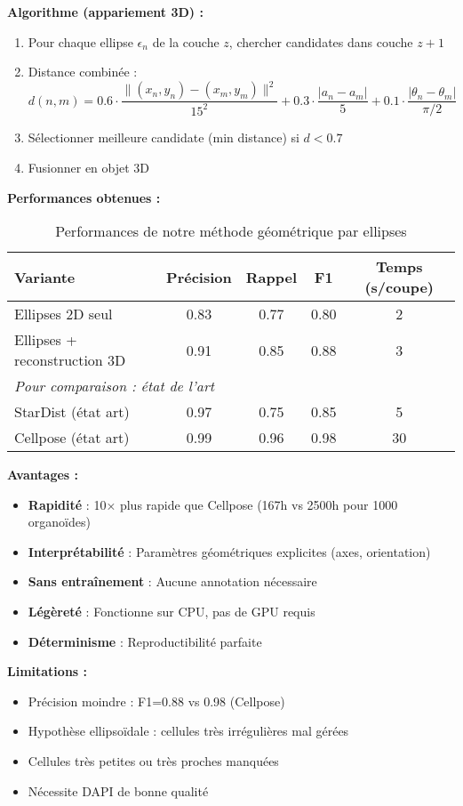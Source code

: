 \textbf{Algorithme (appariement 3D) :}
\begin{enumerate}
    \item Pour chaque ellipse $\epsilon_n$ de la couche $z$, chercher candidates dans couche $z+1$
    \item Distance combinée :
        \[
        d(n, m) = 0.6 \cdot \frac{\|(x_n, y_n) - (x_m, y_m)\|^2}{15^2} + 0.3 \cdot \frac{|a_n - a_m|}{5} + 0.1 \cdot \frac{|\theta_n - \theta_m|}{\pi/2}
        \]
    \item Sélectionner meilleure candidate (min distance) si $d < 0.7$
    \item Fusionner en objet 3D
\end{enumerate}

\textbf{Performances obtenues :}
\begin{table}[h]
\centering
\caption{Performances de notre méthode géométrique par ellipses}
\begin{tabular}{lcccc}
\toprule
\textbf{Variante} & \textbf{Précision} & \textbf{Rappel} & \textbf{F1} & \textbf{Temps (s/coupe)} \\
\midrule
Ellipses 2D seul & 0.83 & 0.77 & 0.80 & 2 \\
Ellipses + reconstruction 3D & 0.91 & 0.85 & 0.88 & 3 \\
\midrule
\multicolumn{5}{l}{\textit{Pour comparaison : état de l'art}} \\
StarDist (état art) & 0.97 & 0.75 & 0.85 & 5 \\
Cellpose (état art) & 0.99 & 0.96 & 0.98 & 30 \\
\bottomrule
\end{tabular}
\end{table}

\textbf{Avantages :}
\begin{itemize}
    \item \textbf{Rapidité} : 10× plus rapide que Cellpose (167h vs 2500h pour 1000 organoïdes)
    \item \textbf{Interprétabilité} : Paramètres géométriques explicites (axes, orientation)
    \item \textbf{Sans entraînement} : Aucune annotation nécessaire
    \item \textbf{Légèreté} : Fonctionne sur CPU, pas de GPU requis
    \item \textbf{Déterminisme} : Reproductibilité parfaite
\end{itemize}

\textbf{Limitations :}
\begin{itemize}
    \item Précision moindre : F1=0.88 vs 0.98 (Cellpose)
    \item Hypothèse ellipsoïdale : cellules très irrégulières mal gérées
    \item Cellules très petites ou très proches manquées
    \item Nécessite DAPI de bonne qualité
\end{itemize}

